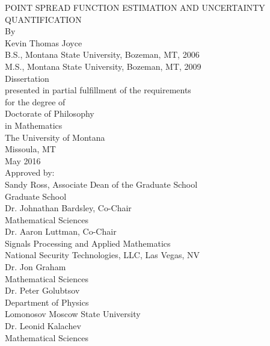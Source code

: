 
\begin{titlepage}

\begin{center}
    \Large POINT SPREAD FUNCTION ESTIMATION AND UNCERTAINTY QUANTIFICATION\\ 
	\vspace{.5cm}
    \normalsize By\\
    \vspace{.5cm}
      Kevin Thomas Joyce\\
    \vspace{.5cm}
      B.S., Montana State University, Bozeman, MT, 2006\\ 
      M.S., Montana State University, Bozeman, MT, 2009\\   
    \vspace{.5cm}
	Dissertation\\
	\vspace{.5cm}
    presented in partial fulfillment of the requirements\\
    for the degree of\\
    \vspace{.5cm}
    Doctorate of Philosophy\\
	in Mathematics\\
    \vspace{.5cm}
    The University of Montana\\
	Missoula, MT\\
    \vspace{.5cm}
    May 2016\\
	\vspace{.5cm}
	Approved by:\\
	\vspace{.5cm}
	Sandy Ross, Associate Dean of the Graduate School\\  
	Graduate School\\
	\vspace{.5cm}
	Dr. Johnathan Bardsley, Co-Chair\\  
	Mathematical Sciences\\
	\vspace{.5cm}
	Dr. Aaron Luttman, Co-Chair\\  
	Signals Processing and Applied Mathematics\\
	National Security Technologies, LLC, Las Vegas, NV\\
	\vspace{.5cm}
	Dr. Jon Graham\\  
	Mathematical Sciences\\
	\vspace{.5cm}
	Dr. Peter Golubtsov\\  
        Department of Physics\\
        Lomonosov Moscow State University\\
	\vspace{.5cm}
	Dr. Leonid Kalachev\\  
	Mathematical Sciences\\
\end{center}

\vspace{1.25in}


\pagebreak

\end{titlepage}
